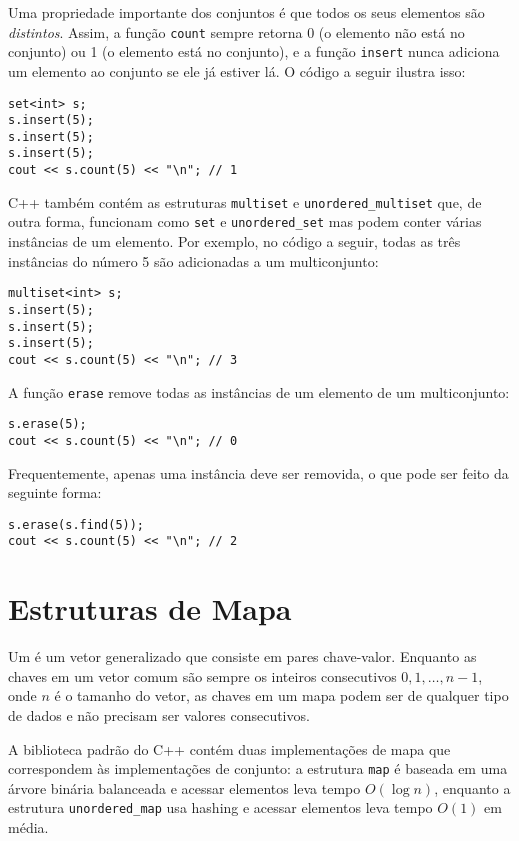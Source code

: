 Uma propriedade importante dos conjuntos é
que todos os seus elementos são \emph{distintos}.
Assim, a função \texttt{count} sempre retorna
0 (o elemento não está no conjunto)
ou 1 (o elemento está no conjunto),
e a função \texttt{insert} nunca adiciona
um elemento ao conjunto se ele já estiver lá.
O código a seguir ilustra isso:

\begin{lstlisting}
set<int> s;
s.insert(5);
s.insert(5);
s.insert(5);
cout << s.count(5) << "\n"; // 1
\end{lstlisting}

C++ também contém as estruturas
\texttt{multiset} e \texttt{unordered\_multiset}
que, de outra forma, funcionam como \texttt{set}
e \texttt{unordered\_set}
mas podem conter várias instâncias de um elemento.
Por exemplo, no código a seguir, todas as três instâncias
do número 5 são adicionadas a um multiconjunto:

\begin{lstlisting}
multiset<int> s;
s.insert(5);
s.insert(5);
s.insert(5);
cout << s.count(5) << "\n"; // 3
\end{lstlisting}
A função \texttt{erase} remove
todas as instâncias de um elemento
de um multiconjunto:
\begin{lstlisting}
s.erase(5);
cout << s.count(5) << "\n"; // 0
\end{lstlisting}
Frequentemente, apenas uma instância deve ser removida,
o que pode ser feito da seguinte forma:
\begin{lstlisting}
s.erase(s.find(5));
cout << s.count(5) << "\n"; // 2
\end{lstlisting}

\section{Estruturas de Mapa}


Um  é um vetor generalizado
que consiste em pares chave-valor.
Enquanto as chaves em um vetor comum são sempre
os inteiros consecutivos $0,1,\ldots,n-1$,
onde $n$ é o tamanho do vetor,
as chaves em um mapa podem ser de qualquer tipo de dados e
não precisam ser valores consecutivos.

A biblioteca padrão do C++ contém duas implementações de mapa
que correspondem às implementações de conjunto: a estrutura
\texttt{map} é baseada em uma árvore binária balanceada e acessar elementos
leva tempo $O(\log n)$,
enquanto a estrutura
\texttt{unordered\_map} usa hashing
e acessar elementos leva tempo $O(1)$ em média.

